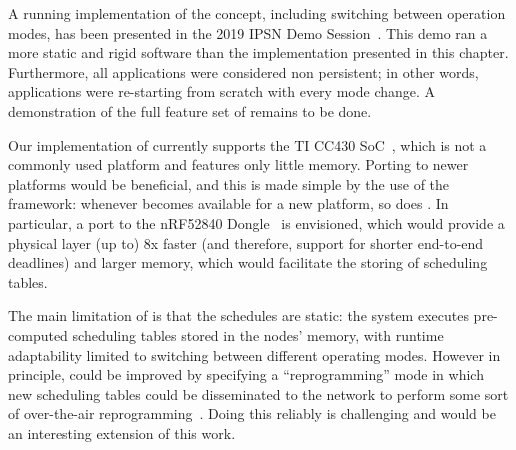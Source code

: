 A running implementation of the \TTW concept, including switching between operation modes, has been presented in the 2019 IPSN Demo Session~\cite{mager2019Demo}. This demo ran a more static and rigid software than the implementation presented in this chapter. Furthermore, all applications were considered non persistent; in other words, applications were re-starting from scratch with every mode change.\linebreak
A demonstration of the full feature set of \TTW remains to be done.

Our implementation of \TTnet currently supports the TI CC430 SoC~\cite{CC430F6137}, which is not a commonly used platform and features only little memory.
Porting \TTnet to newer platforms would be beneficial, and this is made simple by the use of the \baloo framework: whenever \baloo becomes available for a new platform, so does \TTnet.
In particular, a port to the nRF52840 Dongle~\cite{nRF52840} is envisioned, which would provide a physical layer (up to) 8x faster (and therefore, support for shorter end-to-end deadlines) and larger memory, which would facilitate the storing of scheduling tables.

The main limitation of \TTW is that the schedules are static: the system executes pre-computed scheduling tables stored in the nodes' memory, with runtime adaptability limited to switching between different operating modes.
However in principle,  could be improved by specifying a ``reprogramming'' mode in which new scheduling tables could be disseminated to the network to perform some sort of over-the-air reprogramming~\cite{hagedorn2008Rateless}.
Doing this reliably is challenging and would be an interesting extension of this work.
